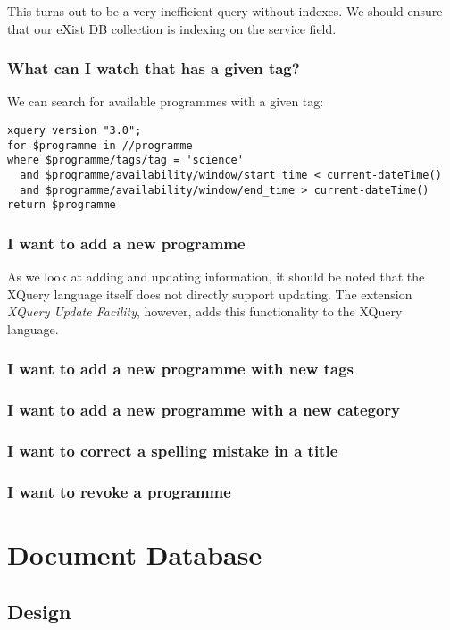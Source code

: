 \documentclass[11pt,a4paper]{article}
\begin{document}
This turns out to be a very inefficient query without indexes. We should ensure
that our eXist DB collection is indexing on the service field.

\subsubsection{What can I watch that has a given tag?}

We can search for available programmes with a given tag:

\begin{lstlisting}
xquery version "3.0";
for $programme in //programme
where $programme/tags/tag = 'science'
  and $programme/availability/window/start_time < current-dateTime()
  and $programme/availability/window/end_time > current-dateTime()
return $programme
\end{lstlisting}

\subsubsection{I want to add a new programme}

As we look at adding and updating information, it should be noted that
the XQuery language itself does not directly support updating. The
extension \emph{XQuery Update Facility}, however, adds this functionality
to the XQuery language.

\subsubsection{I want to add a new programme with new tags}
\subsubsection{I want to add a new programme with a new category}
\subsubsection{I want to correct a spelling mistake in a title}
\subsubsection{I want to revoke a programme}

\section{Document Database}
\subsection{Design}
\end{document}
